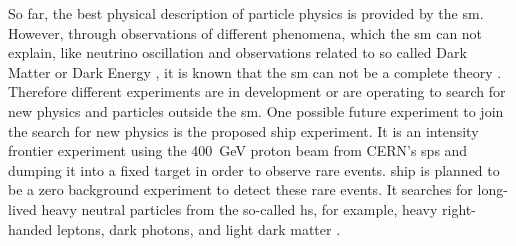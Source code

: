 So far, the best physical description of particle physics is provided by the \ac{sm}.
However, through observations of different phenomena, which the \ac{sm} can not explain, like neutrino oscillation \cite{} and observations related to so called Dark Matter or Dark Energy \cite{}, it is known that the \ac{sm} can not be a complete theory \cite{}.
Therefore different experiments are in development or are operating to search for new physics and particles outside the \ac{sm}.
One possible future experiment to join the search for new physics is the proposed \ac{ship} experiment.
It is an intensity frontier experiment using the \SI{400}{\giga\electronvolt} proton beam from CERN's \ac{sps} and dumping it into a fixed target in order to observe rare events.
\ac{ship} is planned to be a zero background experiment to detect these rare events.
It searches for long-lived heavy neutral particles from the so-called \ac{hs}, for example, heavy right-handed leptons, dark photons, and light dark matter \cite{}.

